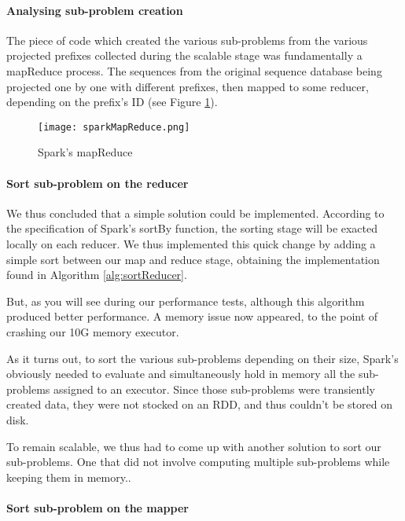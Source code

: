 \documentclass{eplmastersthesis}
\begin{document}
\paragraph{Analysing sub-problem creation}

The piece of code which created the various sub-problems from the various projected prefixes collected during the scalable stage was fundamentally a mapReduce process. The sequences from the original sequence database being projected one by one with different prefixes, then mapped to some reducer, depending on the prefix's ID 
(see Figure \ref{fig:sparkMapReduce}). \newline

\begin{figure}[h]
  \centering
  \texttt{[image: sparkMapReduce.png]}
  \caption{Spark's mapReduce}
  \label{fig:sparkMapReduce}
\end{figure}

\paragraph{Sort sub-problem on the reducer}

We thus concluded that a simple solution could be implemented. According to the specification of Spark's sortBy function, the sorting stage will be exacted locally on each reducer. We thus implemented this quick change by adding a simple sort between our map and reduce stage, obtaining the implementation found in Algorithm \ref{alg:sortReducer}. \newline

But, as you will see during our performance tests, although this algorithm produced better performance. A memory issue now appeared, to the point of crashing our 10G memory executor. \newline

As it turns out, to sort the various sub-problems depending on their size, Spark's obviously needed to evaluate and simultaneously hold in memory all the sub-problems assigned to an executor. Since those sub-problems were transiently created data, they were not stocked on an RDD, and thus couldn't be stored on disk.

To remain scalable, we thus had to come up with another solution to sort our sub-problems. One that did not involve computing multiple sub-problems while keeping them in memory..

\paragraph{Sort sub-problem on the mapper}
\end{document}
